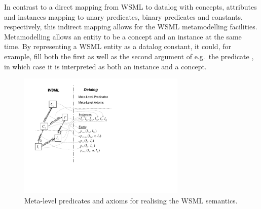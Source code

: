 In contrast to a direct mapping from WSML to datalog with
concepts, attributes and instances mapping to unary predicates,
binary predicates and constants, respectively, this indirect
mapping allows for the WSML metamodelling facilities.
Metamodelling allows an entity to be a concept and an instance at
the same time. By representing a WSML entity as a datalog
constant, it could, for example, fill both the first as well as
the second argument of e.g.\ the predicate \pmo, in which case it
is interpreted as both an instance and a concept.

\begin{figure}[tb]
        \includegraphics[width=8cm]{figures/meta}
        \centering
    \caption{Meta-level predicates and axioms for realising the WSML semantics. \label{fig:meta}}
\end{figure}

